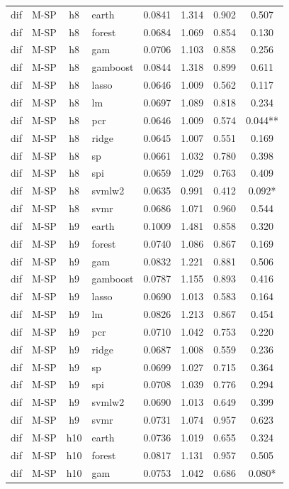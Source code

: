 \begin{ThreePartTable}
\begin{longtable}[t]{llclcccc}
dif & M-SP & h8 & earth & 0.0841 & 1.314 & 0.902 & 0.507\\
dif & M-SP & h8 & forest & 0.0684 & 1.069 & 0.854 & 0.130\\
dif & M-SP & h8 & gam & 0.0706 & 1.103 & 0.858 & 0.256\\
dif & M-SP & h8 & gamboost & 0.0844 & 1.318 & 0.899 & 0.611\\
dif & M-SP & h8 & lasso & 0.0646 & 1.009 & 0.562 & 0.117\\
dif & M-SP & h8 & lm & 0.0697 & 1.089 & 0.818 & 0.234\\
dif & M-SP & h8 & pcr & 0.0646 & 1.009 & 0.574 & 0.044**\\
dif & M-SP & h8 & ridge & 0.0645 & 1.007 & 0.551 & 0.169\\
dif & M-SP & h8 & sp & 0.0661 & 1.032 & 0.780 & 0.398\\
dif & M-SP & h8 & spi & 0.0659 & 1.029 & 0.763 & 0.409\\
dif & M-SP & h8 & svmlw2 & 0.0635 & 0.991 & 0.412 & 0.092*\\
dif & M-SP & h8 & svmr & 0.0686 & 1.071 & 0.960 & 0.544\\
\addlinespace
dif & M-SP & h9 & earth & 0.1009 & 1.481 & 0.858 & 0.320\\
dif & M-SP & h9 & forest & 0.0740 & 1.086 & 0.867 & 0.169\\
dif & M-SP & h9 & gam & 0.0832 & 1.221 & 0.881 & 0.506\\
dif & M-SP & h9 & gamboost & 0.0787 & 1.155 & 0.893 & 0.416\\
dif & M-SP & h9 & lasso & 0.0690 & 1.013 & 0.583 & 0.164\\
dif & M-SP & h9 & lm & 0.0826 & 1.213 & 0.867 & 0.454\\
dif & M-SP & h9 & pcr & 0.0710 & 1.042 & 0.753 & 0.220\\
dif & M-SP & h9 & ridge & 0.0687 & 1.008 & 0.559 & 0.236\\
dif & M-SP & h9 & sp & 0.0699 & 1.027 & 0.715 & 0.364\\
dif & M-SP & h9 & spi & 0.0708 & 1.039 & 0.776 & 0.294\\
dif & M-SP & h9 & svmlw2 & 0.0690 & 1.013 & 0.649 & 0.399\\
dif & M-SP & h9 & svmr & 0.0731 & 1.074 & 0.957 & 0.623\\
\addlinespace
dif & M-SP & h10 & earth & 0.0736 & 1.019 & 0.655 & 0.324\\
dif & M-SP & h10 & forest & 0.0817 & 1.131 & 0.957 & 0.505\\
dif & M-SP & h10 & gam & 0.0753 & 1.042 & 0.686 & 0.080*\\

\end{longtable}
\end{ThreePartTable}

